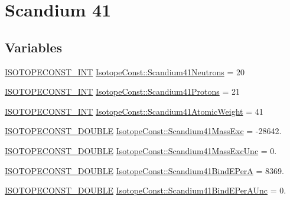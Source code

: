 \hypertarget{group___isotope_const-_scandium-_sc41}{}\section{Scandium 41}
\label{group___isotope_const-_scandium-_sc41}
\subsection*{Variables}
\begin{DoxyCompactItemize}
\item 
\mbox{\hyperlink{group___isotope_const-_macros_ga5f18360b3e99483a35c32d789e62621c}{I\+S\+O\+T\+O\+P\+E\+C\+O\+N\+S\+T\+\_\+\+I\+NT}} \mbox{\hyperlink{group___isotope_const-_scandium-_sc41_ga3ecd50cb035d0d4c080ed0f7a13b9a84}{Isotope\+Const\+::\+Scandium41\+Neutrons}} = 20
\item 
\mbox{\hyperlink{group___isotope_const-_macros_ga5f18360b3e99483a35c32d789e62621c}{I\+S\+O\+T\+O\+P\+E\+C\+O\+N\+S\+T\+\_\+\+I\+NT}} \mbox{\hyperlink{group___isotope_const-_scandium-_sc41_gad7b9fa5970286226b6e540d211443ba3}{Isotope\+Const\+::\+Scandium41\+Protons}} = 21
\item 
\mbox{\hyperlink{group___isotope_const-_macros_ga5f18360b3e99483a35c32d789e62621c}{I\+S\+O\+T\+O\+P\+E\+C\+O\+N\+S\+T\+\_\+\+I\+NT}} \mbox{\hyperlink{group___isotope_const-_scandium-_sc41_gae5a693dec6c179f0f188d2216738c121}{Isotope\+Const\+::\+Scandium41\+Atomic\+Weight}} = 41
\item 
\mbox{\hyperlink{group___isotope_const-_macros_ga8f45a7272ce02c0b4c65c44636ed719a}{I\+S\+O\+T\+O\+P\+E\+C\+O\+N\+S\+T\+\_\+\+D\+O\+U\+B\+LE}} \mbox{\hyperlink{group___isotope_const-_scandium-_sc41_gaeb6c9e3c0049e7b13cf8a35e8796f662}{Isotope\+Const\+::\+Scandium41\+Mass\+Exc}} = -\/28642.
\item 
\mbox{\hyperlink{group___isotope_const-_macros_ga8f45a7272ce02c0b4c65c44636ed719a}{I\+S\+O\+T\+O\+P\+E\+C\+O\+N\+S\+T\+\_\+\+D\+O\+U\+B\+LE}} \mbox{\hyperlink{group___isotope_const-_scandium-_sc41_gac86014f2f640135d5de7aff8efaf4d56}{Isotope\+Const\+::\+Scandium41\+Mass\+Exc\+Unc}} = 0.
\item 
\mbox{\hyperlink{group___isotope_const-_macros_ga8f45a7272ce02c0b4c65c44636ed719a}{I\+S\+O\+T\+O\+P\+E\+C\+O\+N\+S\+T\+\_\+\+D\+O\+U\+B\+LE}} \mbox{\hyperlink{group___isotope_const-_scandium-_sc41_gad129cdcd1fb42716dfb177eb37f0967f}{Isotope\+Const\+::\+Scandium41\+Bind\+E\+PerA}} = 8369.
\item 
\mbox{\hyperlink{group___isotope_const-_macros_ga8f45a7272ce02c0b4c65c44636ed719a}{I\+S\+O\+T\+O\+P\+E\+C\+O\+N\+S\+T\+\_\+\+D\+O\+U\+B\+LE}} \mbox{\hyperlink{group___isotope_const-_scandium-_sc41_ga0be925449b8e148f578570f65784f280}{Isotope\+Const\+::\+Scandium41\+Bind\+E\+Per\+A\+Unc}} = 0.

\end{DoxyCompactItemize}
